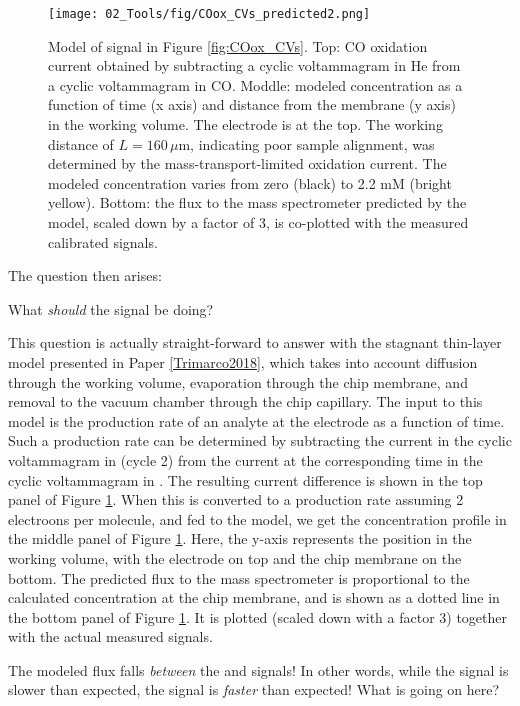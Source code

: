 \begin{figure}[h!]
	\centering
	\texttt{[image: 02\_Tools/fig/COox\_CVs\_predicted2.png]}
	\caption{Model of  signal in Figure \ref{fig:COox_CVs}. Top: CO oxidation current obtained by subtracting a cyclic voltammagram in He from a cyclic voltammagram in CO. Moddle: modeled concentration as a function of time (x axis) and distance from the membrane (y axis) in the working volume. The electrode is at the top. The working distance of $L=160\,\mu$m, indicating poor sample alignment, was determined by the mass-transport-limited  oxidation current. The modeled  concentration varies from zero (black) to 2.2 mM (bright yellow). Bottom: the  flux to the mass spectrometer predicted by the model, scaled down by a factor of 3, is co-plotted with the measured calibrated  signals.}
	\label{fig:COox_pred}
\end{figure}
The question then arises:
\begin{question} 
What \textit{should} the  signal be doing?
\end{question}
This question is actually straight-forward to answer with the stagnant thin-layer model presented in Paper \ref{Trimarco2018}, which takes into account diffusion through the working volume, evaporation through the chip membrane, and removal to the vacuum chamber through the chip capillary. The input to this model is the production rate of an analyte at the electrode as a function of time. Such a production rate can be determined by subtracting the current in the cyclic voltammagram in  (cycle 2) from the current at the corresponding time in the cyclic voltammagram in . The resulting current difference is shown in the top panel of Figure \ref{fig:COox_pred}. When this is converted to a  production rate assuming 2 electroons per  molecule, and fed to the model, we get the concentration profile in the middle panel of Figure \ref{fig:COox_pred}. Here, the y-axis represents the position in the working volume, with the electrode on top and the chip membrane on the bottom. The predicted flux to the mass spectrometer is proportional to the calculated concentration at the chip membrane, and is shown as a dotted line in the bottom panel of Figure \ref{fig:COox_pred}. It is plotted (scaled down with a factor 3) together with the actual measured  signals.

The modeled flux falls \textit{between} the  and  signals! In other words, while the  signal is slower than expected, the  signal is \textit{faster} than expected! What is going on here?

